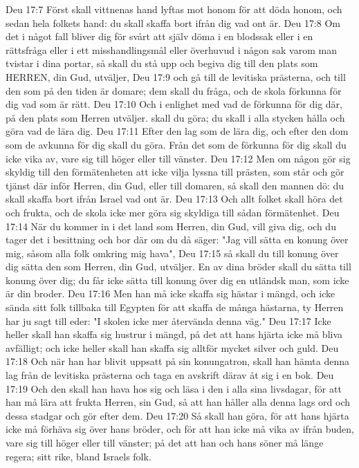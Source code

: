 Deu 17:7  Först skall vittnenas hand lyftas mot honom för att döda honom, och sedan hela folkets hand: du skall skaffa bort ifrån dig vad ont är.
Deu 17:8  Om det i något fall bliver dig för svårt att själv döma i en blodssak eller i en rättsfråga eller i ett misshandlingsmål eller överhuvud i någon sak varom man tvistar i dina portar, så skall du stå upp och begiva dig till den plats som HERREN, din Gud, utväljer,
Deu 17:9  och gå till de levitiska prästerna, och till den som på den tiden är domare; dem skall du fråga, och de skola förkunna för dig vad som är rätt.
Deu 17:10  Och i enlighet med vad de förkunna för dig där, på den plats som Herren utväljer. skall du göra; du skall i alla stycken hålla och göra vad de lära dig.
Deu 17:11  Efter den lag som de lära dig, och efter den dom som de avkunna för dig skall du göra. Från det som de förkunna för dig skall du icke vika av, vare sig till höger eller till vänster.
Deu 17:12  Men om någon gör sig skyldig till den förmätenheten att icke vilja lyssna till prästen, som står och gör tjänst där inför Herren, din Gud, eller till domaren, så skall den mannen dö: du skall skaffa bort ifrån Israel vad ont är.
Deu 17:13  Och allt folket skall höra det och frukta, och de skola icke mer göra sig skyldiga till sådan förmätenhet.
Deu 17:14  När du kommer in i det land som Herren, din Gud, vill giva dig, och du tager det i besittning och bor där om du då säger: "Jag vill sätta en konung över mig, såsom alla folk omkring mig hava",
Deu 17:15  så skall du till konung över dig sätta den som Herren, din Gud, utväljer. En av dina bröder skall du sätta till konung över dig; du får icke sätta till konung över dig en utländsk man, som icke är din broder.
Deu 17:16  Men han må icke skaffa sig hästar i mängd, och icke sända sitt folk tillbaka till Egypten för att skaffa de många hästarna, ty Herren har ju sagt till eder: "I skolen icke mer återvända denna väg."
Deu 17:17  Icke heller skall han skaffa sig hustrur i mängd, på det att hans hjärta icke må bliva avfälligt; och icke heller skall han skaffa sig alltför mycket silver och guld.
Deu 17:18  Och när han har blivit uppsatt på sin konungatron, skall han hämta denna lag från de levitiska prästerna och taga en avskrift därav åt sig i en bok.
Deu 17:19  Och den skall han hava hos sig och läsa i den i alla sina livsdagar, för att han må lära att frukta Herren, sin Gud, så att han håller alla denna lags ord och dessa stadgar och gör efter dem.
Deu 17:20  Så skall han göra, för att hans hjärta icke må förhäva sig över hans bröder, och för att han icke må vika av ifrån buden, vare sig till höger eller till vänster; på det att han och hans söner må länge regera; sitt rike, bland Israels folk.
